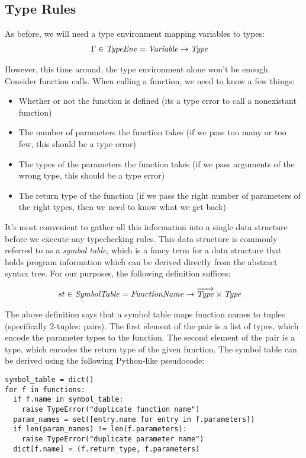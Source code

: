 \subsection{Type Rules}
As before, we will need a type environment mapping variables to types:
\begin{align*}
  \Gamma \in \mathit{TypeEnv} &= \mathit{Variable} \to \mathit{Type}
\end{align*}

However, this time around, the type environment alone won't be enough.
Consider function calls.
When calling a function, we need to know a few things:
\begin{itemize}
\item Whether or not the function is defined (its a type error to call a nonexistant function)
\item The number of parameters the function takes (if we pass too many or too few, this should be a type error)
\item The types of the parameters the function takes (if we pass arguments of the wrong type, this should be a type error)
\item The return type of the function (if we pass the right number of parameters of the right types, then we need to know what we get back)
\end{itemize}

It's most convenient to gather all this information into a single data structure before we execute any typechecking rules.
This data structure is commonly referred to as a \emph{symbol table}, which is a fancy term for a data structure that holds program information which can be derived directly from the abstract syntax tree.
For our purposes, the following definition suffices:

\begin{align*}
  st \in \mathit{SymbolTable} &= \mathit{FunctionName} \to \overrightarrow{\mathit{Type}} \times \mathit{Type}
\end{align*}

The above definition says that a symbol table maps function names to tuples (specifically 2-tuples: pairs).
The first element of the pair is a list of types, which encode the parameter types to the function.
The second element of the pair is a type, which encodes the return type of the given function.
The symbol table can be derived using the following Python-like pseudocode:
\begin{verbatim}
symbol_table = dict()
for f in functions:
  if f.name in symbol_table:
    raise TypeError("duplicate function name")
  param_names = set([entry.name for entry in f.parameters])
  if len(param_names) != len(f.parameters):
    raise TypeError("duplicate parameter name")
  dict[f.name] = (f.return_type, f.parameters)
\end{verbatim}


